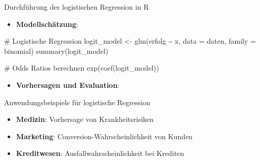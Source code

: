 \documentclass[
  ignorenonframetext,
]{beamer}
\newenvironment{Shaded}{\begin{snugshade}}{\end{snugshade}}
\newcommand{\AttributeTok}[1]{\textcolor[rgb]{0.40,0.45,0.13}{#1}}
\newcommand{\CommentTok}[1]{\textcolor[rgb]{0.37,0.37,0.37}{#1}}
\newcommand{\FunctionTok}[1]{\textcolor[rgb]{0.28,0.35,0.67}{#1}}
\newcommand{\NormalTok}[1]{\textcolor[rgb]{0.00,0.23,0.31}{#1}}
\newcommand{\OtherTok}[1]{\textcolor[rgb]{0.00,0.23,0.31}{#1}}
\newcommand{\SpecialCharTok}[1]{\textcolor[rgb]{0.37,0.37,0.37}{#1}}
\newcommand{\StringTok}[1]{\textcolor[rgb]{0.13,0.47,0.30}{#1}}
\providecommand{\tightlist}{%
  \setlength{\itemsep}{0pt}\setlength{\parskip}{0pt}}
\begin{document}
\begin{frame}[fragile]{Durchführung der logistischen Regression in R}
\protect{}\label{durchfuxfchrung-der-logistischen-regression-in-r}
\begin{itemize}
\tightlist
\item
  \textbf{Modellschätzung}:
\end{itemize}

\begin{Shaded}
\begin{Highlighting}[]
  \CommentTok{\# Logistische Regression}
\NormalTok{  logit\_model }\OtherTok{\textless{}{-}} \FunctionTok{glm}\NormalTok{(erfolg }\SpecialCharTok{\textasciitilde{}}\NormalTok{ x, }\AttributeTok{data =}\NormalTok{ daten, }\AttributeTok{family =}\NormalTok{ binomial)}
  \FunctionTok{summary}\NormalTok{(logit\_model)}

  \CommentTok{\# Odds Ratios berechnen}
  \FunctionTok{exp}\NormalTok{(}\FunctionTok{coef}\NormalTok{(logit\_model))}
\end{Highlighting}
\end{Shaded}

\begin{itemize}
\tightlist
\item
  \textbf{Vorhersagen und Evaluation}:
\end{itemize}

\begin{Shaded}
\end{Shaded}
\end{frame}

\begin{frame}{Anwendungsbeispiele für logistische Regression}
\protect{}\label{anwendungsbeispiele-fuxfcr-logistische-regression}
\begin{itemize}
\tightlist
\item
  \textbf{Medizin}: Vorhersage von Krankheitsrisiken
\item
  \textbf{Marketing}: Conversion-Wahrscheinlichkeit von Kunden
\item
  \textbf{Kreditwesen}: Ausfallwahrscheinlichkeit bei Krediten
\end{itemize}
\end{frame}
\end{document}
